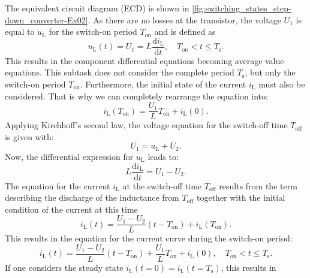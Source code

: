 \begin{solutionblock}
	
	The equivalent circuit diagram (ECD) is shown in \autoref{fig:switching_states_step-down_converter-Ex02}.
	As there are no losses at the transistor, the voltage $U_{\mathrm{1}}$ is equal to $u_{\mathrm{L}}$ for the switch-on period $T_{\mathrm{on}}$ and is defined as
	\begin{equation}
		u_{\mathrm{L}}(t) = U_{\mathrm{1}} = L \frac{\mathrm{d} i_{\mathrm{L}} }{\mathrm{d} t}, \quad T_{\mathrm{on}} < t \leq T_{\mathrm{s}}.
	\end{equation}
	This results in the component differential equations becoming average value equations. This subtask does not consider the complete period $T_{\mathrm{s}}$, but only the switch-on period $T_{\mathrm{on}}$. Furthermore, the initial state of the current $i_{\mathrm{L}}$ must also be considered.
	That is why we can completely rearrange the equation into:
	\begin{equation}
		i_{\mathrm{L}}(T_{\mathrm{on}}) =  \frac{U_{\mathrm{1}} }{L}T_{\mathrm{on}} +  i_{\mathrm{L}}(0).
	\end{equation}
	Applying Kirchhoff's second law, the voltage equation for  the switch-off time $T_{\mathrm{off}}$ is given with:
	\begin{equation}
		U_{\mathrm{1}} = u_{\mathrm{L}} + U_{\mathrm{2}}.
	\end{equation}
	Now, the differential expression for $u_{\mathrm{L}}$ leads to:
	\begin{equation}
		L \frac{\mathrm{d} i_{\mathrm{L}} }{\mathrm{d} t} = U_{\mathrm{1}} - U_{\mathrm{2}}.
	\end{equation}
	The equation for the current $i_{\mathrm{L}}$ at the switch-off time $T_{\mathrm{off}}$ results from the term describing the discharge of the inductance from $T_{\mathrm{off}}$ together with the initial condition of the current at this time
	\begin{equation}
		i_{\mathrm{L}}(t) = \frac{U_{\mathrm{1}}-U_{\mathrm{2}} }{L} (t-T_{\mathrm{on}})+i_{\mathrm{L}}(T_{\mathrm{on}}).
	\end{equation}
	This results in the equation for the current curve during the switch-on period:
	\begin{equation}
		i_{\mathrm{L}}(t) = \frac{U_{\mathrm{1}}-U_{\mathrm{2}} }{L} (t-T_{\mathrm{on}})+\frac{U_{\mathrm{1}}}{L}T_{\mathrm{on}}+i_{\mathrm{L}}(0), \quad T_{\mathrm{on}} < t \leq T_{\mathrm{s}}.
	\end{equation}
	If one considers the steady state $i_{\mathrm{L}}(t=0)=i_{\mathrm{L}}(t=T_{\mathrm{s}})$, this results in

\end{solutionblock}
